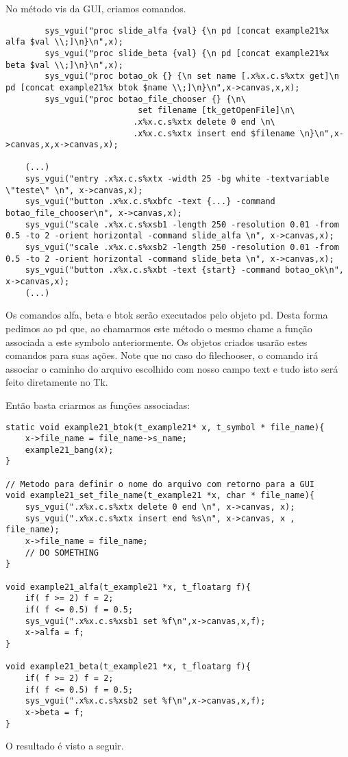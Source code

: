 No método vis da GUI, criamos comandos.

\begin{lstlisting}
	    sys_vgui("proc slide_alfa {val} {\n pd [concat example21%x alfa $val \\;]\n}\n",x);
	    sys_vgui("proc slide_beta {val} {\n pd [concat example21%x beta $val \\;]\n}\n",x);
	    sys_vgui("proc botao_ok {} {\n set name [.x%x.c.s%xtx get]\n pd [concat example21%x btok $name \\;]\n}\n",x->canvas,x,x);
	    sys_vgui("proc botao_file_chooser {} {\n\
						   set filename [tk_getOpenFile]\n\
						  .x%x.c.s%xtx delete 0 end \n\
						  .x%x.c.s%xtx insert end $filename \n}\n",x->canvas,x,x->canvas,x);

	(...)
	sys_vgui("entry .x%x.c.s%xtx -width 25 -bg white -textvariable \"teste\" \n", x->canvas,x);
	sys_vgui("button .x%x.c.s%xbfc -text {...} -command botao_file_chooser\n", x->canvas,x);
	sys_vgui("scale .x%x.c.s%xsb1 -length 250 -resolution 0.01 -from 0.5 -to 2 -orient horizontal -command slide_alfa \n", x->canvas,x);
	sys_vgui("scale .x%x.c.s%xsb2 -length 250 -resolution 0.01 -from 0.5 -to 2 -orient horizontal -command slide_beta \n", x->canvas,x);
	sys_vgui("button .x%x.c.s%xbt -text {start} -command botao_ok\n", x->canvas,x);
	(...)
\end{lstlisting}

Os comandos alfa, beta e btok serão executados pelo objeto pd. Desta forma pedimos ao pd que, ao chamarmos este método o mesmo chame
a função associada a este symbolo anteriormente. Os objetos criados usarão estes comandos para suas ações.
Note que no caso do filechooser, o comando irá associar o caminho do arquivo escolhido com nosso campo text e tudo isto será feito
diretamente no Tk.

Então basta criarmos as funções associadas:

\begin{lstlisting}
static void example21_btok(t_example21* x, t_symbol * file_name){
    x->file_name = file_name->s_name;
    example21_bang(x); 
}

// Metodo para definir o nome do arquivo com retorno para a GUI
void example21_set_file_name(t_example21 *x, char * file_name){
    sys_vgui(".x%x.c.s%xtx delete 0 end \n", x->canvas, x);
    sys_vgui(".x%x.c.s%xtx insert end %s\n", x->canvas, x , file_name);
    x->file_name = file_name;
    // DO SOMETHING
}

void example21_alfa(t_example21 *x, t_floatarg f){
    if( f >= 2) f = 2;
    if( f <= 0.5) f = 0.5; 
    sys_vgui(".x%x.c.s%xsb1 set %f\n",x->canvas,x,f);
    x->alfa = f;
}

void example21_beta(t_example21 *x, t_floatarg f){
    if( f >= 2) f = 2;
    if( f <= 0.5) f = 0.5; 
    sys_vgui(".x%x.c.s%xsb2 set %f\n",x->canvas,x,f);
    x->beta = f;
}
\end{lstlisting}

O resultado é visto a seguir.




